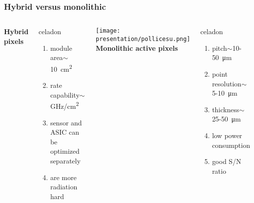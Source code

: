     \begin{frame}
        \frametitle{Hybrid versus monolithic}
        \begin{columns}
                \centering\textbf{Hybrid pixels}
                \begin{beamercolorbox}[ rounded=true, center]{celadon}
                    \begin{enumerate}
                        \item module area$\sim$\SI{10}{cm\squared}
                        \item rate capability$\sim$\si{GHz/cm\squared}
                        \item sensor and ASIC can be optimized separately
                        \item are more radiation hard 
                    \end{enumerate} 
                \end{beamercolorbox}
                \texttt{[image: presentation/pollicesu.png]}
                \centering\textbf{Monolithic active pixels}
                \begin{beamercolorbox}[ rounded=true, center]{celadon}
                    \begin{enumerate}
                        \item pitch$\sim$10-\SI{50}{\um}
                        \item point resolution$\sim$5-\SI{10}{\um}
                        \item thickness$\sim$25-\SI{50}{\um}
                        \item low power consumption
                        \item good S/N ratio
                    \end{enumerate}    
                \end{beamercolorbox}
        \end{columns}
       

\end{frame}
